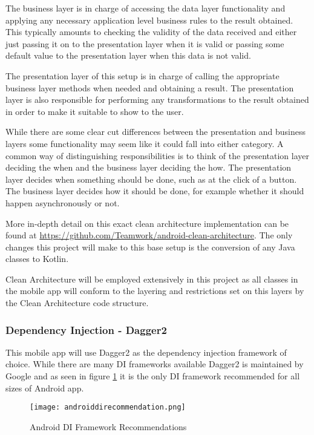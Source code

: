 The business layer is in charge of accessing the data layer functionality and applying any necessary application level business rules to the result obtained. This typically amounts to checking the validity of the data received and either just passing it on to the presentation layer when it is valid or passing some default value to the presentation layer when this data is not valid.

The presentation layer of this setup is in charge of calling the appropriate business layer methods when needed and obtaining a result. The presentation layer is also responsible for performing any transformations to the result obtained in order to make it suitable to show to the user.

While there are some clear cut differences between the presentation and business layers some functionality may seem like it could fall into either category. A common way of distinguishing responsibilities is to think of the presentation layer deciding the when and the business layer deciding the how. The presentation layer decides when something should be done, such as at the click of a button. The business layer decides how it should be done, for example whether it should happen asynchronously or not.

More in-depth detail on this exact clean architecture implementation can be found at \url{https://github.com/Teamwork/android-clean-architecture}. The only changes this project will make to this base setup is the conversion of any Java classes to Kotlin.

Clean Architecture will be employed extensively in this project as all classes in the mobile app will conform to  the layering and restrictions set on this layers by the Clean Architecture code structure.

\subsubsection{Dependency Injection - Dagger2}

This mobile app will use Dagger2 as the dependency injection framework of choice. While there are many DI frameworks available Dagger2 is maintained by Google and as seen in figure \ref{fig:androiddi} it is the only DI framework recommended for all sizes of Android app. 

\begin{figure}[ht]
  \centering
      \texttt{[image: androiddirecommendation.png]}
  \caption[Android DI Framework Recommendations]{Android DI Framework Recommendations\cite{androiddi}}
  \label{fig:androiddi}
\end{figure}

